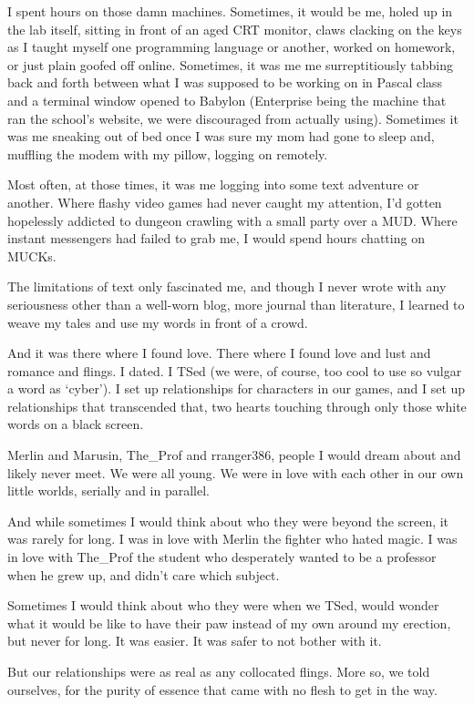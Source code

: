 I spent hours on those damn machines. Sometimes, it would be me, holed up in the lab itself, sitting in front of an aged CRT monitor, claws clacking on the keys as I taught myself one programming language or another, worked on homework, or just plain goofed off online. Sometimes, it was me me surreptitiously tabbing back and forth between what I was supposed to be working on in Pascal class and a terminal window opened to Babylon (Enterprise being the machine that ran the school's website, we were discouraged from actually using). Sometimes it was me sneaking out of bed once I was sure my mom had gone to sleep and, muffling the modem with my pillow, logging on remotely.

Most often, at those times, it was me logging into some text adventure or another. Where flashy video games had never caught my attention, I'd gotten hopelessly addicted to dungeon crawling with a small party over a MUD. Where instant messengers had failed to grab me, I would spend hours chatting on MUCKs.

The limitations of text only fascinated me, and though I never wrote with any seriousness other than a well-worn blog, more journal than literature, I learned to weave my tales and use my words in front of a crowd.

And it was there where I found love. There where I found love and lust and romance and flings. I dated. I TSed (we were, of course, too cool to use so vulgar a word as `cyber'). I set up relationships for characters in our games, and I set up relationships that transcended that, two hearts touching through only those white words on a black screen.

Merlin and Marusin, The\_Prof and rranger386, people I would dream about and likely never meet. We were all young. We were in love with each other in our own little worlds, serially and in parallel.

And while sometimes I would think about who they were beyond the screen, it was rarely for long. I was in love with Merlin the fighter who hated magic. I was in love with The\_Prof the student who desperately wanted to be a professor when he grew up, and didn't care which subject.

Sometimes I would think about who they were when we TSed, would wonder what it would be like to have their paw instead of my own around my erection, but never for long. It was easier. It was safer to not bother with it.

But our relationships were as real as any collocated flings. More so, we told ourselves, for the purity of essence that came with no flesh to get in the way.

